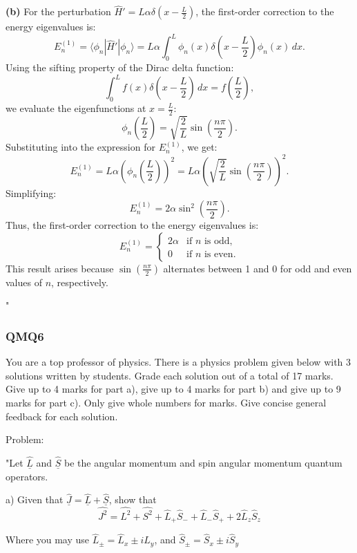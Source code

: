 \textbf{(b)} For the perturbation \(\hat{H}' = L \alpha \delta\left(x - \frac{L}{2}\right)\), the first-order correction to the energy eigenvalues is:
\[
E_n^{(1)} = \langle \phi_n | \hat{H}' | \phi_n \rangle = L \alpha \int_0^L \phi_n(x) \delta\left(x - \frac{L}{2}\right) \phi_n(x) \, dx.
\]
Using the sifting property of the Dirac delta function:
\[
\int_0^L f(x) \delta\left(x - \frac{L}{2}\right) \, dx = f\left(\frac{L}{2}\right),
\]
we evaluate the eigenfunctions at \(x = \frac{L}{2}\):
\[
\phi_n\left(\frac{L}{2}\right) = \sqrt{\frac{2}{L}} \sin\left(\frac{n \pi}{2}\right).
\]
Substituting into the expression for \(E_n^{(1)}\), we get:
\[
E_n^{(1)} = L \alpha \left(\phi_n\left(\frac{L}{2}\right)\right)^2 = L \alpha \left(\sqrt{\frac{2}{L}} \sin\left(\frac{n \pi}{2}\right)\right)^2.
\]
Simplifying:
\[
E_n^{(1)} = 2 \alpha \sin^2\left(\frac{n \pi}{2}\right).
\]
Thus, the first-order correction to the energy eigenvalues is:
\[
E_n^{(1)} = 
\begin{cases}
2 \alpha & \text{if } n \text{ is odd}, \\
0 & \text{if } n \text{ is even}.
\end{cases}
\]
This result arises because \(\sin\left(\frac{n \pi}{2}\right)\) alternates between 1 and 0 for odd and even values of \(n\), respectively.

"

\subsubsection{QMQ6}

You are a top professor of physics. There is a physics problem given below with 3 solutions written by students. Grade each solution out of a total of 17 marks. Give up to 4 marks for part a), give up to 4 marks for part b) and give up to 9 marks for part c). Only give whole numbers for marks. Give concise general feedback for each solution. 

Problem:

"Let \( \hat{\underline{L}} \) and \( \hat{\underline{S}} \) be the angular momentum and spin angular momentum quantum operators. 

a) Given that \( \hat{\underline{J}} = \hat{\underline{L}} + \hat{\underline{S}} \), show that 
\[ \hat{J^{2}} =  \hat{L^{2}} + \hat{S^{2}} + \hat{L}_{+}\hat{S}_{-} +  \hat{L}_{-}\hat{S}_{+} + 2\hat{L}_{z}\hat{S}_{z} \]

Where you may use  \( \hat{L}_{\pm} = \hat{L}_{x} \pm i\hat{L}_{y} \), and \( \hat{S}_{\pm} = \hat{S}_{x} \pm i\hat{S}_{y} \)

